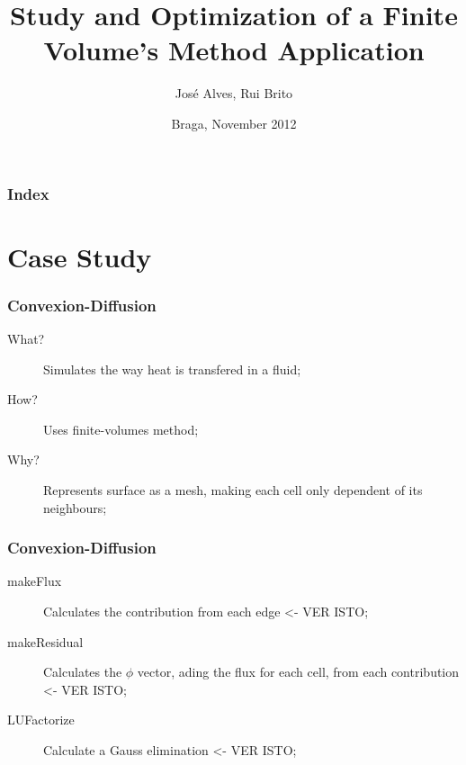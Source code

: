 \documentclass{beamer}
\title{Study and Optimization of a Finite Volume's Method Application}
\author{José Alves, Rui Brito}
\institute[pg22765, pg22781]{
	Universidade do Minho
}
\date{Braga, November 2012}
\begin{document}

\maketitle%

\begin{frame}
	\frametitle{Index}
	\tableofcontents
\end{frame}

\section{Case Study}

\begin{frame}[plain]
	\frametitle{Convexion-Diffusion}
	\begin{description}
		\item [What?]Simulates the way heat is transfered in a fluid;
		\item [How?] Uses finite-volumes method;
		\item [Why?] Represents surface as a mesh, making each cell only dependent of its neighbours;
	\end{description}
\end{frame}

\begin{frame}[plain]
	\frametitle{Convexion-Diffusion}
	\begin{description}
		\item [makeFlux] Calculates the contribution from each edge <- VER ISTO;
		\item [makeResidual] Calculates the $\phi$ vector, ading the flux for each cell, from each contribution <- VER ISTO;
		\item [LUFactorize] Calculate a Gauss elimination <- VER ISTO;
	\end{description}
\end{frame}
\end{document}
